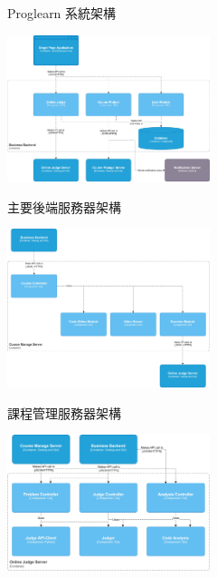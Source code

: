 \documentclass[12pt]{article}
\begin{document}
\begin{enumerate}
\begin{enumerate}
\begin{enumerate}[label=(\arabic*)]
\begin{figure}[htb]
\begin{subfigure}{0.45\linewidth}
{              }
              \caption{Proglearn 系統架構}
              \label{arc1}            
            \end{subfigure}
            \begin{subfigure}{0.45\linewidth}
              \centering
              \href{https://raw.githubusercontent.com/programingtw/proglearn-plan/main/img/arc2.jpg}{
                \includegraphics[width=0.65\textwidth]{./img/arc2.jpg}
              }
              \caption{主要後端服務器架構}
              \label{arc2}
            \end{subfigure}
            \bigskip
            \begin{subfigure}{0.45\linewidth}
              \centering
              \href{https://raw.githubusercontent.com/programingtw/proglearn-plan/main/img/arc3.jpg}{
                \includegraphics[width=0.65\textwidth]{./img/arc3.jpg}
              }
              \caption{課程管理服務器架構}
              \label{arc3}
            \end{subfigure}
            \begin{subfigure}{0.45\linewidth}
              \centering
              \href{https://raw.githubusercontent.com/programingtw/proglearn-plan/main/img/arc4.jpg}{
                \includegraphics[width=0.65\textwidth]{./img/arc4.jpg}
}
\end{subfigure}
\end{figure}
\end{enumerate}
\end{enumerate}
\end{enumerate}
\end{document}
